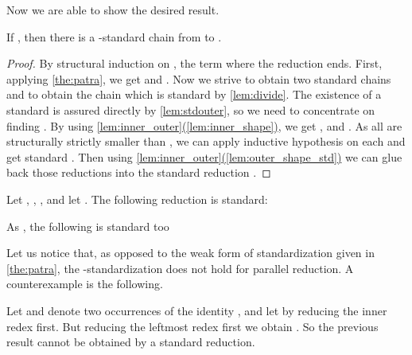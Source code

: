 Now we are able to show the desired result.
\begin{theorem}[Standardization]\label{thm:standard-inner}
If , then there is a -standard chain from  to .
\end{theorem}
\begin{proof}
  By structural induction on , the term where the reduction ends.
     First, applying \autoref{the:patra}, we get
   and . Now we
  strive to obtain two standard chains  and
   to obtain the chain  which
  is standard by \autoref{lem:divide}. The existence of a standard
   is assured directly by \autoref{lem:stdouter}, so we
  need to concentrate on finding .
  By using \hyperref[lem:inner_outer]{\autoref*{lem:inner_outer}(\ref*{lem:inner_shape})}, we get
  ,  and
  . As all  are structurally
  strictly smaller than , we can apply inductive hypothesis on
  each  and get standard . Then
  using \hyperref[lem:outer_shape_std]{\autoref*{lem:inner_outer}(\ref*{lem:outer_shape_std})} we can glue back those
  reductions into the standard reduction .
\end{proof}
\begin{example}
Let , ,
, and
let .
The following reduction is standard:

As , the following is standard too

\end{example}

Let us notice that, as opposed to the weak form of standardization given in \autoref{the:patra}, the
-standardization does not hold for parallel reduction. A counterexample is the following.
\begin{example}
Let  and  denote two occurrences of the identity , and let
 by reducing the inner redex first.
But reducing the leftmost redex first we obtain
.
So the previous result cannot be obtained by a standard reduction. 
 \end{example}




